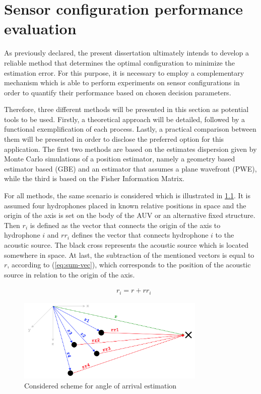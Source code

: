 \chapter{Sensor configuration performance evaluation} \label{chap:proposed_sys}

As previously declared, the present dissertation ultimately intends to develop a reliable method that determines the optimal configuration to minimize the estimation error. For this purpose, it is necessary to employ a complementary mechanism which is able to perform experiments on sensor configurations in order to quantify their performance based on chosen decision parameters.

Therefore, three different methods will be presented in this section as potential tools to be used. Firstly, a theoretical approach will be detailed, followed by a functional exemplification of each process. Lastly, a practical comparison between them will be presented in order to disclose the preferred option for this application. The first two methods are based on the estimates dispersion given by Monte Carlo simulations of a position estimator, namely a geometry based estimator based (GBE) and an estimator that assumes a plane wavefront (PWE), while the third is based on the Fisher Information Matrix.

For all methods, the same scenario is considered which is illustrated in \ref{fig:AoA-init}. It is assumed four hydrophones placed in known relative positions in space and the origin of the axis is set on the body of the AUV or an alternative fixed structure. Then $r_i$ is defined as the vector that connects the origin of the axis to hydrophone $i$ and $rr_i$ defines the vector that connects hydrophone $i$ to the acoustic source. The black cross represents the acoustic source which is located somewhere in space. At last, the subtraction of the mentioned vectors is equal to $r$, according to (\ref{eq:sum-vec}), which corresponds to the position of the acoustic source in relation to the origin of the axis.

\begin{eqnarray}
	& r_i = r + rr_i
	\label{eq:sum-vec}
\end{eqnarray}

\begin{figure}[!htbp]
	\centering
	\includegraphics[width=0.8\textwidth]{figures/AoA-init}
	\captionsetup{justification=centering,margin=2cm}
	\caption{Considered scheme for angle of arrival estimation}
	\label{fig:AoA-init}
\end{figure}

